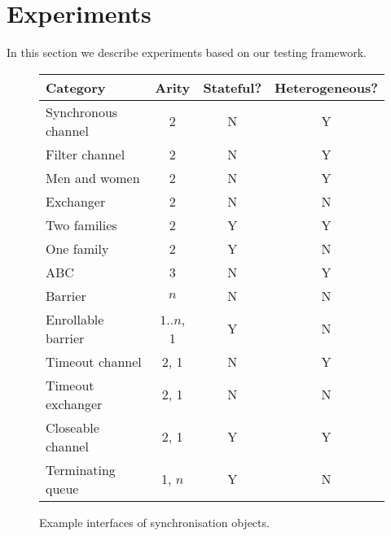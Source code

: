 \section{Experiments}
\label{sec:experiments}

In this section we describe experiments based on our testing framework. 


\begin{figure}
\begin{center}
\begin{tabular}{lccc}
Category            & Arity & Stateful? & Heterogeneous? \\ \hline
Synchronous channel & 2     & N         & Y \\
Filter channel      & 2     & N         & Y \\
Men and women        & 2     & N         & Y \\
Exchanger           & 2     & N         & N \\
Two families        & 2     & Y         & Y \\
One family          & 2     & Y         & N \\
ABC                 & 3     & N         & Y \\
Barrier             & $n$   & N         & N \\
Enrollable barrier  & $1\mathord{..} n$, 1 & Y & N \\
Timeout channel     & 2, 1  & N         & Y \\
Timeout exchanger   & 2, 1  & N         & N \\
Closeable channel   & 2, 1  & Y         & Y \\
Terminating queue   & 1, $n$ & Y        & N  
\end{tabular}
\end{center}
\caption{Example interfaces of synchronisation objects.  \label{fig:examples}}
\end{figure}




